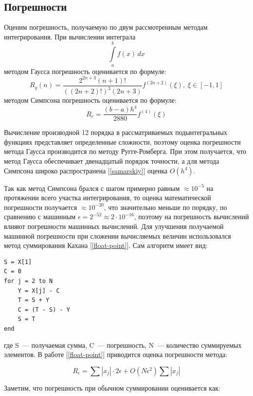 \subsection{Погрешности}
Оценим погрешность, получаемую по двум рассмотренным методам интегрирования.
При вычислении интеграла 
\begin{equation}
\int\limits^b_af(x)\,dx
\end{equation}
методом Гаусса погрешность оценивается по формуле:  
\begin{equation}
R_g(n) = \dfrac{2^{2n+3}(n+1)!}{((2n+2)!)^3(2n+3)}f^{(2n+2)}(\xi),\; \xi \in [-1, 1]
\end{equation}
методом Симпсона погрешность оценивается по формуле:  
\begin{equation}
R_c = \dfrac{(b-a)h^4}{2880} f^{(4)}(\xi)
\end{equation}

Вычисление производной 12 порядка в рассматриваемых подынтегральных функциях представляет определенные сложности,
поэтому оценка погрешности метода Гаусса производится по методу Ругге-Ромберга. При этом получается, что метод Гаусса 
обеспечивает двенадцатый порядок точности, а для метода Симпсона  широко распространена [\ref{samarskiy}] оценка $O(h^4)$.

Так как метод Симпсона брался с шагом примерно равным $\approx 10^{-5}$ на протяжении всего участка интегрирования, то оценка математической погрешности получается $\approx 10^{-20}$, что значительно меньше по порядку, по сравнению с машинным $\epsilon = 2^{-52} \approx 2\cdot10^{-16}$, поэтому на погрешность вычислений влияют погрешности машинных вычислений. 
Для улучшения получаемой машинной погрешности при сложении вычисляемых величин использовался метод суммирования Кахана [\ref{float-point}]. 
Сам алгоритм имеет вид:

\begin{lstlisting}
S = X[1]
C = 0
for j = 2 to N
	Y = X[j] - C
	T = S + Y
	C = (T - S) - Y
	S = T
end
\end{lstlisting}
где S~--- получаемая сумма, C~--- погрешность, N~--- количество суммируемых элементов. В работе [\ref{float-point}] приводится 
оценка погрешности метода:

\begin{equation}
R_{\epsilon} = \sum|x_j|\cdot 2\epsilon +  O(N\epsilon^2)\sum|x_j|
\end{equation}

Заметим, что погрешность при обычном суммировании оценивается как:


